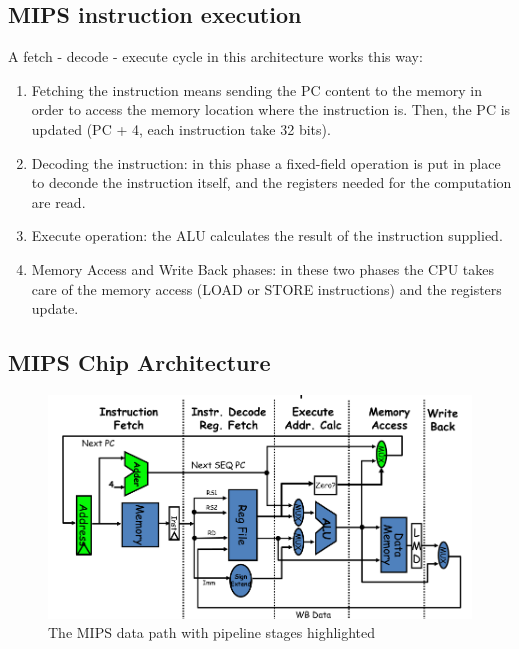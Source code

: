 \documentclass[10pt,a4paper]{article}
\begin{document}
			\subsection{MIPS instruction execution}
				A fetch - decode - execute cycle in this architecture works this way:
				\begin{enumerate}
					\item Fetching the instruction means sending the PC content to the memory in order to access the memory location where the instruction is. Then, the PC is updated (PC + 4, each instruction take 32 bits).
					\item Decoding the instruction: in this phase a fixed-field operation is put in place to deconde the instruction itself, and the registers needed for the computation are read.
					\item Execute operation: the ALU calculates the result of the instruction supplied.
					\item Memory Access and Write Back phases: in these two phases the CPU takes care of the memory access (LOAD or STORE instructions) and the registers update.
				\end{enumerate}

				
			\subsection{MIPS Chip Architecture}
				\begin{figure}[H]
					\centering
					\includegraphics[width = \textwidth]{./images/MIPSDP.png}
					\caption{The MIPS data path with pipeline stages highlighted}
				\end{figure}
				
\end{document}
